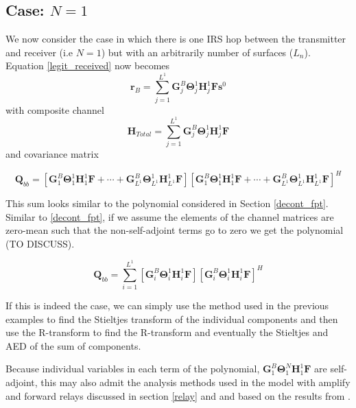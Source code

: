 \documentclass[12pt,a4paper]{report}
\begin{document}
\subsection{Case: $N=1$}
We now consider the case in which there is one IRS hop between the transmitter and receiver (i.e $N=1$) but with an  arbitrarily number of surfaces ($L_n$). 
Equation \ref{legit_received} now becomes 
\begin{equation}
\mathbf{r}_{B} = \sum_{j = 1}^{L^{1}} \mathbf{G}^{B}_{j}\boldsymbol{\Theta}^{1}_{j}\mathbf{H}^{1}_{j}\mathbf{F}\mathbf{s}^0
\end{equation}
with composite channel
\begin{equation}
\mathbf{H}_{Total} = \sum_{j = 1}^{L^{1}} \mathbf{G}^{B}_{j}\boldsymbol{\Theta}^{1}_{j}\mathbf{H}^{1}_{j}\mathbf{F}
\end{equation}
and covariance matrix

\begin{equation}
\mathbf{Q}_{bb} = [\mathbf{G}^{B}_{1}\boldsymbol{\Theta}^{1}_{1}\mathbf{H}^{1}_{1}\mathbf{F} + 
\cdots + \mathbf{G}^{B}_{L^{1}}\boldsymbol{\Theta}^{1}_{L^{1}}\mathbf{H}^{1}_{L^{1}}\mathbf{F}]
[\mathbf{G}^{B}_{1}\boldsymbol{\Theta}^{1}_{1}\mathbf{H}^{1}_{1}\mathbf{F} + 
\cdots + \mathbf{G}^{B}_{L^{1}}\boldsymbol{\Theta}^{1}_{L^{1}}\mathbf{H}^{1}_{L^{1}}\mathbf{F}]^H
\end{equation}

This sum looks similar to the polynomial considered in Section \ref{decont_fpt}. Similar to \ref{decont_fpt}, if we assume the elements of the channel matrices are zero-mean such that the non-self-adjoint terms go to zero we get the polynomial   (TO DISCUSS). 

\begin{equation}
\mathbf{Q}_{bb} = \sum_{i=1}^{L^{1}}[\mathbf{G}^{B}_{i}\boldsymbol{\Theta}^{1}_{i}\mathbf{H}^{1}_{i}\mathbf{F}]
[\mathbf{G}^{B}_{i}\boldsymbol{\Theta}^{1}_{i}\mathbf{H}^{1}_{i}\mathbf{F}]^H
\end{equation}

If this is indeed the case, we can simply use the method used in the previous examples to find the Stieltjes transform of the individual components and then use the R-transform to find the R-transform and eventually the Stieltjes and AED of the sum of components. 
\par
Because individual variables in each term of the 
polynomial, $\mathbf{G}^{B}_{1}\boldsymbol{\Theta}^{N}_{1}\mathbf{H}^{1}_{1}\mathbf{F}$ are self-adjoint, this may also admit the analysis methods used in the model with amplify and forward relays discussed in section \ref{relay} and \cite{hadley2019capacity} and based on the results from \cite{belinschi2017analytic}.
\end{document}
